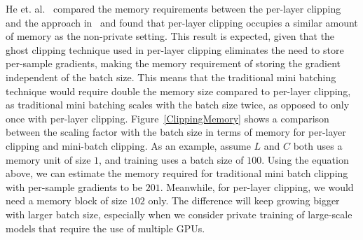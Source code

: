 He et. al.~\cite{RefWorks:RefID:39-he2022exploring} compared the memory requirements between the per-layer clipping and the approach in~\cite{RefWorks:RefID:51-yousefpouropacus:} and found that per-layer clipping occupies a similar amount of memory as the non-private setting. This result is expected, given that the ghost clipping technique used in per-layer clipping eliminates the need to store per-sample gradients, making the memory requirement of storing the gradient independent of the batch size. This means that the traditional mini batching technique would require double the memory size compared to per-layer clipping, as traditional mini batching scales with the batch size twice, as opposed to only once with per-layer clipping. Figure~\ref{ClippingMemory} shows a comparison between the scaling factor with the batch size in terms of memory for per-layer clipping and mini-batch clipping. As an example, assume $L$ and $C$ both uses a memory unit of size $1$, and training uses a batch size of $100$. Using the equation above, we can estimate the memory required for traditional mini batch clipping with per-sample gradients to be $201$. Meanwhile, for per-layer clipping, we would need a memory block of size $102$ only. The difference will keep growing bigger with larger batch size, especially when we consider private training of large-scale models that require the use of multiple GPUs.
